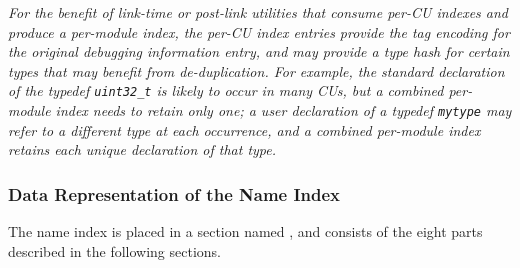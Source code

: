\textit{For the benefit of link-time or post-link utilities that consume
per-CU indexes and produce a per-module index, the per-CU index
entries provide the tag encoding for the original debugging
information entry, and may provide a type hash for certain types that
may benefit from de-duplication. For example, the standard declaration
of the typedef \texttt{uint32\_t} is likely to occur in many CUs, but a
combined per-module index needs to retain only one; a user declaration
of a typedef \texttt{mytype} may refer to a different type at each
occurrence, and a combined per-module index retains each unique
declaration of that type.}


\subsubsection{Data Representation of the Name Index}
\label{chap:datarepresentationofthenameindex}
The name index is placed in a section named \dotdebugnames, and
consists of the eight parts described in the following sections.

